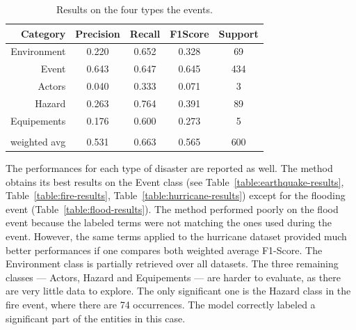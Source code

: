 \begin{table}[htb]
    \centering
    \caption{Results on the four types the events.}
    \begin{tabular}{rcccc}
        Category     & Precision & \textbf{Recall} & F1\-Score & Support \\
        \toprule
        Environment  & 0.220     & 0.652           & 0.328     & 69      \\
        Event        & 0.643     & 0.647           & 0.645     & 434     \\
        Actors       & 0.040     & 0.333           & 0.071     & 3       \\
        Hazard       & 0.263     & 0.764           & 0.391     & 89      \\
        Equipements  & 0.176     & 0.600           & 0.273     & 5       \\
                     &           &                 &           &         \\
        weighted avg & 0.531     & 0.663           & 0.565     & 600     \\
        \bottomrule
    \end{tabular}
    \label{table:overall-results}
\end{table}

The performances for each type of disaster are reported as well.
The method obtains its best results on the Event class (see Table~\ref{table:earthquake-results}, Table~\ref{table:fire-results}, Table~\ref{table:hurricane-results}) except for the flooding event (Table~\ref{table:flood-results}).
The method performed poorly on the flood event because the labeled terms were not matching the ones used during the event.
However, the same terms applied to the hurricane dataset provided much better performances if one compares both weighted average F1-Score.
The Environment class is partially retrieved over all datasets.
The three remaining classes — Actors, Hazard and Equipements — are harder to evaluate, as there are very little data to explore.
The only significant one is the Hazard class in the fire event, where there are 74 occurrences.
The model correctly labeled a significant part of the entities in this case.

